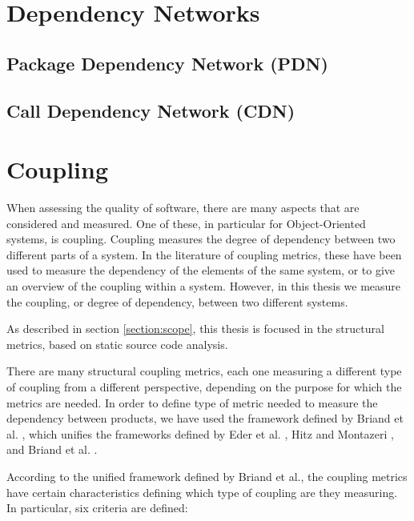 \section{Dependency Networks}
\subsection{Package Dependency Network (PDN)}
\subsection{Call Dependency Network (CDN)}

\section{Coupling}
When assessing the quality of software, there are many aspects that are considered and measured. One of these, in particular for Object-Oriented systems, is coupling. Coupling measures the degree of dependency between two different parts of a system. In the literature of coupling metrics, these have been used to measure the dependency of the elements of the same system, or to give an overview of the coupling within a system. However, in this thesis we measure the coupling, or degree of dependency, between two different systems.

As described in section \ref{section:scope}, this thesis is focused in the structural metrics, based on static source code analysis.

There are many structural coupling metrics, each one measuring a different type of coupling from a different perspective, depending on the purpose for which the metrics are needed. In order to define type of metric needed to measure the dependency between products, we have used the framework defined by Briand et al. \cite{briand1999unified}, which unifies the frameworks defined by Eder et al. \cite{eder1994coupling}, Hitz and Montazeri \cite{hitz1995measuring}, and Briand et al. \cite{briand1997investigation}.

According to the unified framework defined by Briand et al., the coupling metrics have certain characteristics defining which type of coupling are they measuring. In particular, six criteria are defined:

